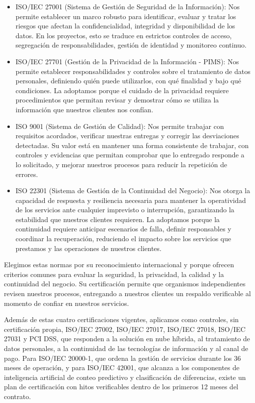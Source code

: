\documentclass[11pt]{article}
\providecommand{\tightlist}{%
  \setlength{\itemsep}{0pt}\setlength{\parskip}{0pt}}
\begin{document}
\begin{itemize}
\tightlist
\item
  ISO/IEC 27001 (Sistema de Gestión de Seguridad de la Información): Nos permite establecer un marco robusto para identificar, evaluar y tratar los riesgos que afectan la confidencialidad, integridad y disponibilidad de los datos. En los proyectos, esto se traduce en estrictos controles de acceso, segregación de responsabilidades, gestión de identidad y monitoreo continuo.
\item
  ISO/IEC 27701 (Gestión de la Privacidad de la Información - PIMS): Nos permite establecer responsabilidades y controles sobre el tratamiento de datos personales, definiendo quién puede utilizarlos, con qué finalidad y bajo qué condiciones. La adoptamos porque el cuidado de la privacidad requiere procedimientos que permitan revisar y demostrar cómo se utiliza la información que nuestros clientes nos confían.
\item
  ISO 9001 (Sistema de Gestión de Calidad): Nos permite trabajar con requisitos acordados, verificar nuestras entregas y corregir las desviaciones detectadas. Su valor está en mantener una forma consistente de trabajar, con controles y evidencias que permitan comprobar que lo entregado responde a lo solicitado, y mejorar nuestros procesos para reducir la repetición de errores.
\item
  ISO 22301 (Sistema de Gestión de la Continuidad del Negocio): Nos otorga la capacidad de respuesta y resiliencia necesaria para mantener la operatividad de los servicios ante cualquier imprevisto o interrupción, garantizando la estabilidad que nuestros clientes requieren. La adoptamos porque la continuidad requiere anticipar escenarios de falla, definir responsables y coordinar la recuperación, reduciendo el impacto sobre los servicios que prestamos y las operaciones de nuestros clientes.
\end{itemize}

Elegimos estas normas por su reconocimiento internacional y porque ofrecen criterios comunes para evaluar la seguridad, la privacidad, la calidad y la continuidad del negocio. Su certificación permite que organismos independientes revisen nuestros procesos, entregando a nuestros clientes un respaldo verificable al momento de confiar en nuestros servicios.

Además de estas cuatro certificaciones vigentes, aplicamos como controles, sin certificación propia, ISO/IEC 27002, ISO/IEC 27017, ISO/IEC 27018, ISO/IEC 27031 y PCI DSS, que responden a la solución en nube híbrida, al tratamiento de datos personales, a la continuidad de las tecnologías de información y al canal de pago. Para ISO/IEC 20000-1, que ordena la gestión de servicios durante los 36 meses de operación, y para ISO/IEC 42001, que alcanza a los componentes de inteligencia artificial de conteo predictivo y clasificación de diferencias, existe un plan de certificación con hitos verificables dentro de los primeros 12 meses del contrato.
\end{document}
